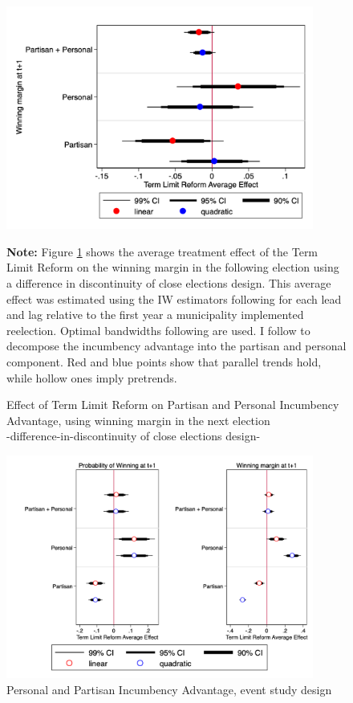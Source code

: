 \documentclass[12pt]{amsart}
\numberwithin{equation}{section}
\theoremstyle{definition}
\theoremstyle{definition}
\theoremstyle{definition}
\begin{document}
\begin{appendix}
\begin{figure}[h]   
\centering    
 \caption{Effect of Term Limit Reform on Partisan and Personal Incumbency Advantage, using winning margin in the next election \\ -difference-in-discontinuity of close elections design-}
 \label{fig:personal_vs_partisan_margin}
\includegraphics[width=0.9\textwidth]{../Figures_incumbency/partisan_personal_inc_advantage_margin.png}
       \captionsetup{justification=centering}
         
 \textbf{Note:} Figure \ref{fig:personal_vs_partisan_margin} shows the average treatment effect of the Term Limit Reform on the winning margin in the following election using a difference in discontinuity of close elections design. This average effect was estimated using the IW estimators following \citet{abraham_sun_2020} for each lead and lag relative to the first year a municipality implemented reelection. Optimal bandwidths following \citet{calonicoetal_2014} are used. I follow \citet{fowler_hall_2014} to decompose the incumbency advantage into the partisan and personal component. Red and blue points show that parallel trends hold, while hollow ones imply pretrends. 
\end{figure}           

 \begin{figure}[h]   
\centering
 \caption{Personal and Partisan Incumbency Advantage, event study design}
 \label{fig:naive_partisan&personal}
 \includegraphics[width=0.9\textwidth]{../Figures_incumbency/naive_personalvspartisan_advantage.png}
 

\end{figure}
\end{appendix}
\end{document}
